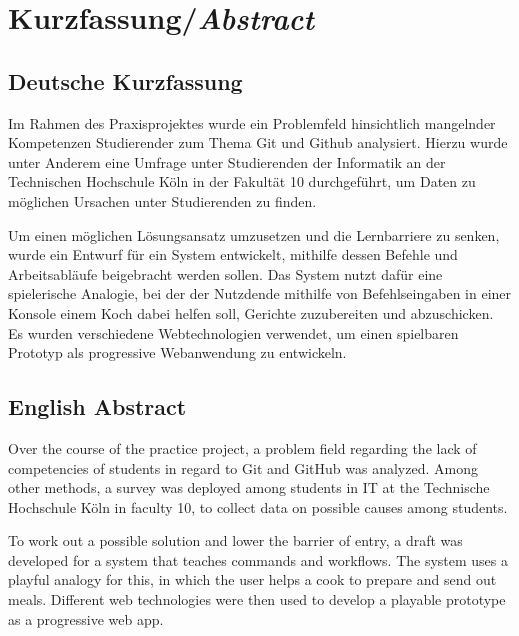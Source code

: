 \chapter*{Kurzfassung/\emph{Abstract}}
\label{chap:abstract}
\section{Deutsche Kurzfassung}

Im Rahmen des Praxisprojektes wurde ein Problemfeld hinsichtlich mangelnder Kompetenzen Studierender zum Thema Git und Github analysiert. Hierzu wurde unter Anderem eine Umfrage unter Studierenden der Informatik an der Technischen Hochschule Köln in der Fakultät 10 durchgeführt, um Daten zu möglichen Ursachen unter Studierenden zu finden.

Um einen möglichen Lösungsansatz umzusetzen und die Lernbarriere zu senken, wurde ein Entwurf für ein System entwickelt, mithilfe dessen Befehle und Arbeitsabläufe beigebracht werden sollen.
Das System nutzt dafür eine spielerische Analogie, bei der der Nutzdende mithilfe von Befehlseingaben in einer Konsole einem Koch dabei helfen soll, Gerichte zuzubereiten und abzuschicken.
Es wurden verschiedene Webtechnologien verwendet, um einen spielbaren Prototyp als progressive Webanwendung zu entwickeln.

\section{English Abstract}

Over the course of the practice project, a problem field regarding the lack of competencies of students in regard to Git and GitHub was analyzed. Among other methods, a survey was deployed among students in IT at the Technische Hochschule Köln in faculty 10, to collect data on possible causes among students.

To work out a possible solution and lower the barrier of entry, a draft was developed for a system that teaches commands and workflows.
The system uses a playful analogy for this, in which the user helps a cook to prepare and send out meals.
Different web technologies were then used to develop a playable prototype as a progressive web app.




